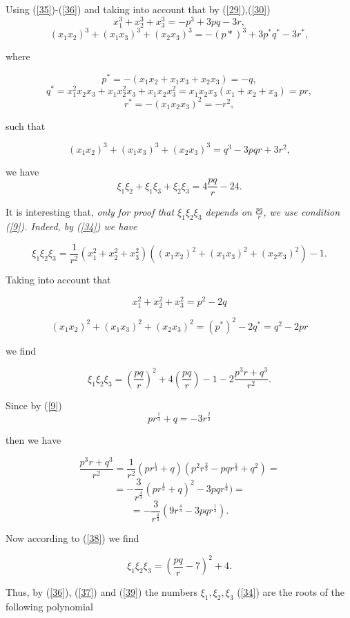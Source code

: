 \documentclass[12pt,oneside,english]{amsart}
\begin{document}
Using (\ref{35})-(\ref{36}) and taking into account that by
(\ref{29}),(\ref{30})
$$
x_1^3+x_2^3+x_3^3=-p^3+3pq-3r,
$$
$$
(x_1x_2)^3+(x_1x_3)^3+(x_2x_3)^3=-(p*)^3+3p^*q^*-3r^*,
$$

where

$$
p^*=-(x_1x_2+x_1x_3+x_2x_3)=-q,
$$
$$
q^*=x_1^2x_2x_3+x_1x_2^2x_3+x_1x_2x_3^2=x_1x_2x_3(x_1+x_2+x_3)=pr,
$$
$$
r^*=-(x_1x_2x_3)^2=-r^2,
$$

such that

$$
(x_1x_2)^3+(x_1x_3)^3+(x_2x_3)^3=q^3-3pqr+3r^2,
$$

we have
\begin{equation}\label{37}
\xi_1\xi_2+\xi_1\xi_3+\xi_2\xi_3=4\frac{pq}{r}-24.
\end{equation}

It is interesting that, \slshape only \upshape for proof that
$\xi_1\xi_2\xi_3$ depends on $\frac{pq}{r}$, we use condition
(\ref{9}). Indeed, by (\ref{34}) we have

$$
\xi_1\xi_2\xi_3=\frac{1}{r^2}(x_1^2+x_2^2+x_3^2)((x_1x_2)^2+(x_1x_3)^2+(x_2x_3)^2)-1.
$$

Taking into account that

$$
x_1^2+x_2^2+x_3^2=p^2-2q
$$

$$
(x_1x_2)^2+(x_1x_3)^2+(x_2x_3)^2=(p^*)^2-2q^*=q^2-2pr
$$

we find

\begin{equation}\label{38}
\xi_1\xi_2\xi_3=\left(\frac{pq}{r}\right)^2+4\left(\frac{pq}{r}\right)-1
-2\frac{p^3r+q^3}{r^2}.
\end{equation}

Since by (\ref{9})
$$
pr^{\frac 1 3}+q=-3r^{\frac 2 3}
$$

then we have
\newpage

$$
\frac{p^3r+q^3}{r^2}=\frac{1}{r^2}(pr^{\frac 1 3}+q)(p^2r^{\frac 2
3}-pqr^{\frac 1 3}+q^2)=
$$
$$
=-\frac{3}{r^{\frac 4 3}}(pr^{\frac 1 3}+q)^2-3pqr^{\frac 1 3})=
$$
$$
=-\frac{3}{r^{\frac 4 3}}(9r^{\frac 4 3}-3pqr^{\frac 1 3}).
$$

Now according to (\ref{38}) we find

\begin{equation}\label{39}
\xi_1\xi_2\xi_3=\left(\frac{pq}{r}-7\right)^2+4.
\end{equation}

Thus, by (\ref{36}), (\ref{37}) and (\ref{39}) the numbers
$\xi_1,\xi_2,\xi_3 $ (\ref{34}) are the roots of the following
polynomial
\end{document}

